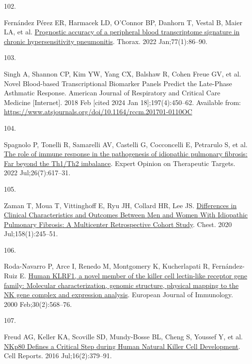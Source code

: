 \documentclass[
]{article}
\newlength{\cslhangindent}
\newlength{\csllabelwidth}
\newenvironment{CSLReferences}[2] %
 {\begin{list}{}{%
  \setlength{\itemindent}{0pt}
  \setlength{\leftmargin}{0pt}
  \setlength{\parsep}{0pt}
  \ifodd #1
   \setlength{\leftmargin}{\cslhangindent}
   \setlength{\itemindent}{-1\cslhangindent}
  \fi
  \setlength{\itemsep}{#2\baselineskip}}}
 {\end{list}}
\newcommand{\CSLLeftMargin}[1]{\parbox[t]{\csllabelwidth}{\strut#1\strut}}
\newcommand{\CSLRightInline}[1]{\parbox[t]{\linewidth - \csllabelwidth}{\strut#1\strut}}
\begin{document}
\begin{CSLReferences}{0}{1}
\CSLLeftMargin{102. }%
\CSLRightInline{Fernández Pérez ER, Harmacek LD, O'Connor BP, Danhorn T, Vestal B, Maier LA, et al. \href{https://doi.org/10.1136/thoraxjnl-2020-214790}{Prognostic accuracy of a peripheral blood transcriptome signature in chronic hypersensitivity pneumonitis}. Thorax. 2022 Jan;77(1):86--90. }

\CSLLeftMargin{103. }%
\CSLRightInline{Singh A, Shannon CP, Kim YW, Yang CX, Balshaw R, Cohen Freue GV, et al. Novel {Blood}-based {Transcriptional} {Biomarker} {Panels} {Predict} the {Late}-{Phase} {Asthmatic} {Response}. American Journal of Respiratory and Critical Care Medicine {[}Internet{]}. 2018 Feb {[}cited 2024 Jan 18{]};197(4):450--62. Available from: \url{https://www.atsjournals.org/doi/10.1164/rccm.201701-0110OC}}

\CSLLeftMargin{104. }%
\CSLRightInline{Spagnolo P, Tonelli R, Samarelli AV, Castelli G, Cocconcelli E, Petrarulo S, et al. \href{https://doi.org/10.1080/14728222.2022.2114897}{The role of immune response in the pathogenesis of idiopathic pulmonary fibrosis: Far beyond the {Th1}/{Th2} imbalance}. Expert Opinion on Therapeutic Targets. 2022 Jul;26(7):617--31. }

\CSLLeftMargin{105. }%
\CSLRightInline{Zaman T, Moua T, Vittinghoff E, Ryu JH, Collard HR, Lee JS. \href{https://doi.org/10.1016/j.chest.2020.02.009}{Differences in {Clinical} {Characteristics} and {Outcomes} {Between} {Men} and {Women} {With} {Idiopathic} {Pulmonary} {Fibrosis}: {A} {Multicenter} {Retrospective} {Cohort} {Study}}. Chest. 2020 Jul;158(1):245--51. }

\CSLLeftMargin{106. }%
\CSLRightInline{Roda-Navarro P, Arce I, Renedo M, Montgomery K, Kucherlapati R, Fernández-Ruiz E. \href{https://doi.org/10.1002/1521-4141(200002)30:2\%3C568::AID-IMMU568\%3E3.0.CO;2-Y}{Human {KLRF1}, a novel member of the killer cell lectin-like receptor gene family: Molecular characterization, genomic structure, physical mapping to the {NK} gene complex and expression analysis}. European Journal of Immunology. 2000 Feb;30(2):568--76. }

\CSLLeftMargin{107. }%
\CSLRightInline{Freud AG, Keller KA, Scoville SD, Mundy-Bosse BL, Cheng S, Youssef Y, et al. \href{https://doi.org/10.1016/j.celrep.2016.05.095}{{NKp80} {Defines} a {Critical} {Step} during {Human} {Natural} {Killer} {Cell} {Development}}. Cell Reports. 2016 Jul;16(2):379--91. }


\end{CSLReferences}
\end{document}
